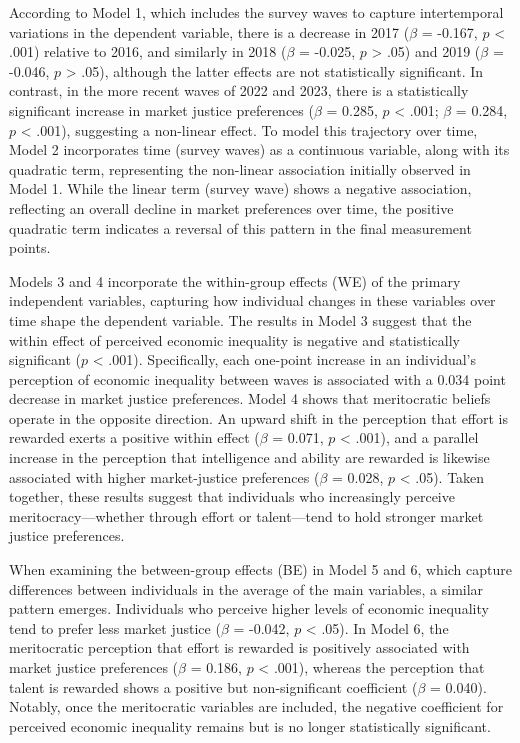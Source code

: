 \documentclass[
  12pt,
]{article}
\begin{document}
According to Model 1, which includes the survey waves to capture
intertemporal variations in the dependent variable, there is a decrease
in 2017 (\(\beta\) = -0.167, \(p\) \textless{} .001) relative to 2016,
and similarly in 2018 (\(\beta\) = -0.025, \(p\) \textgreater{} .05) and
2019 (\(\beta\) = -0.046, \(p\) \textgreater{} .05), although the latter
effects are not statistically significant. In contrast, in the more
recent waves of 2022 and 2023, there is a statistically significant
increase in market justice preferences (\(\beta\) = 0.285, \(p\)
\textless{} .001; \(\beta\) = 0.284, \(p\) \textless{} .001), suggesting
a non-linear effect. To model this trajectory over time, Model 2
incorporates time (survey waves) as a continuous variable, along with
its quadratic term, representing the non-linear association initially
observed in Model 1. While the linear term (survey wave) shows a
negative association, reflecting an overall decline in market
preferences over time, the positive quadratic term indicates a reversal
of this pattern in the final measurement points.

Models 3 and 4 incorporate the within-group effects (WE) of the primary
independent variables, capturing how individual changes in these
variables over time shape the dependent variable. The results in Model 3
suggest that the within effect of perceived economic inequality is
negative and statistically significant (\(p\) \textless{} .001).
Specifically, each one-point increase in an individual's perception of
economic inequality between waves is associated with a 0.034 point
decrease in market justice preferences. Model 4 shows that meritocratic
beliefs operate in the opposite direction. An upward shift in the
perception that effort is rewarded exerts a positive within effect
(\(\beta\) = 0.071, \(p\) \textless{} .001), and a parallel increase in
the perception that intelligence and ability are rewarded is likewise
associated with higher market-justice preferences (\(\beta\) = 0.028,
\(p\) \textless{} .05). Taken together, these results suggest that
individuals who increasingly perceive meritocracy---whether through
effort or talent---tend to hold stronger market justice preferences.

When examining the between-group effects (BE) in Model 5 and 6, which
capture differences between individuals in the average of the main
variables, a similar pattern emerges. Individuals who perceive higher
levels of economic inequality tend to prefer less market justice
(\(\beta\) = -0.042, \(p\) \textless{} .05). In Model 6, the
meritocratic perception that effort is rewarded is positively associated
with market justice preferences (\(\beta\) = 0.186, \(p\) \textless{}
.001), whereas the perception that talent is rewarded shows a positive
but non-significant coefficient (\(\beta\) = 0.040). Notably, once the
meritocratic variables are included, the negative coefficient for
perceived economic inequality remains but is no longer statistically
significant.
\end{document}
